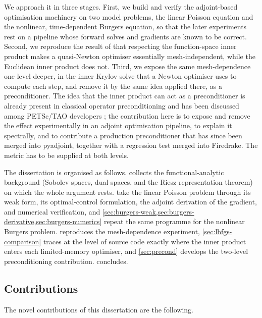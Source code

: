\documentclass[a4paper,11pt]{article}
\theoremstyle{spacedplain} \newtheorem{theorem}[counter]{Theorem} \newtheorem{lemma}[counter]{Lemma} \newtheorem{prop}[counter]{Proposition} \newtheorem{cor}[counter]{Corollary}
\theoremstyle{spaceddefinition} \newtheorem{defn}[counter]{Definition} \newtheorem{example}[counter]{Example} \newtheorem{remark}[counter]{Remark}
\begin{document}
We approach it in three stages. First, we build and verify the adjoint-based optimisation machinery on two model problems, the linear Poisson equation and the nonlinear, time-dependent Burgers equation, so that the later experiments rest on a pipeline whose forward solves and gradients are known to be correct. Second, we reproduce the result of \citet{shfp2017} that respecting the function-space inner product makes a quasi-Newton optimiser essentially mesh-independent, while the Euclidean inner product does not. Third, we expose the same mesh-dependence one level deeper, in the inner Krylov solve that a Newton optimiser uses to compute each step, and remove it by the same idea applied there, as a preconditioner. The idea that the inner product can act as a preconditioner is already present in classical operator preconditioning \citep{kirby2010, mardal2011} and has been discussed among PETSc/TAO developers \citep{petsctao_discord2025}; the contribution here is to expose and remove the effect experimentally in an adjoint optimisation pipeline, to explain it spectrally, and to contribute a production preconditioner that has since been merged into pyadjoint, together with a regression test merged into Firedrake. The metric has to be supplied at both levels.

The dissertation is organised as follows.  collects the functional-analytic background (Sobolev spaces, dual spaces, and the Riesz representation theorem) on which the whole argument rests.  take the linear Poisson problem through its weak form, its optimal-control formulation, the adjoint derivation of the gradient, and numerical verification, and \cref{sec:burgers-weak,sec:burgers-derivative,sec:burgers-numerics} repeat the same programme for the nonlinear Burgers problem.  reproduces the mesh-dependence experiment, \cref{sec:lbfgs-comparison} traces at the level of source code exactly where the inner product enters each limited-memory optimiser, and \cref{sec:precond} develops the two-level preconditioning contribution.  concludes.

\subsection{Contributions}

The novel contributions of this dissertation are the following.
\end{document}
